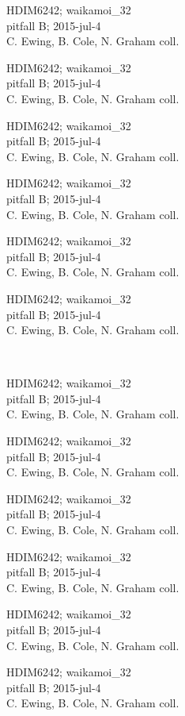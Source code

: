 \documentclass[2pt]{extarticle}
\begin{document}
\noindent
\parbox{0.16\textwidth}{\tiny \raggedright \rule[-0.3\baselineskip]{0pt}{10pt}HDIM6242; waikamoi\_32\\ pitfall B; 2015-jul-4\\ C. Ewing, B. Cole, N. Graham coll.}
\parbox{0.16\textwidth}{\tiny \raggedright \rule[-0.3\baselineskip]{0pt}{10pt}HDIM6242; waikamoi\_32\\ pitfall B; 2015-jul-4\\ C. Ewing, B. Cole, N. Graham coll.}
\parbox{0.16\textwidth}{\tiny \raggedright \rule[-0.3\baselineskip]{0pt}{10pt}HDIM6242; waikamoi\_32\\ pitfall B; 2015-jul-4\\ C. Ewing, B. Cole, N. Graham coll.}
\parbox{0.16\textwidth}{\tiny \raggedright \rule[-0.3\baselineskip]{0pt}{10pt}HDIM6242; waikamoi\_32\\ pitfall B; 2015-jul-4\\ C. Ewing, B. Cole, N. Graham coll.}
\parbox{0.16\textwidth}{\tiny \raggedright \rule[-0.3\baselineskip]{0pt}{10pt}HDIM6242; waikamoi\_32\\ pitfall B; 2015-jul-4\\ C. Ewing, B. Cole, N. Graham coll.}
\parbox{0.16\textwidth}{\tiny \raggedright \rule[-0.3\baselineskip]{0pt}{10pt}HDIM6242; waikamoi\_32\\ pitfall B; 2015-jul-4\\ C. Ewing, B. Cole, N. Graham coll.} \\ 
\vspace{0.001in} 

\noindent
\parbox{0.16\textwidth}{\tiny \raggedright \rule[-0.3\baselineskip]{0pt}{10pt}HDIM6242; waikamoi\_32\\ pitfall B; 2015-jul-4\\ C. Ewing, B. Cole, N. Graham coll.}
\parbox{0.16\textwidth}{\tiny \raggedright \rule[-0.3\baselineskip]{0pt}{10pt}HDIM6242; waikamoi\_32\\ pitfall B; 2015-jul-4\\ C. Ewing, B. Cole, N. Graham coll.}
\parbox{0.16\textwidth}{\tiny \raggedright \rule[-0.3\baselineskip]{0pt}{10pt}HDIM6242; waikamoi\_32\\ pitfall B; 2015-jul-4\\ C. Ewing, B. Cole, N. Graham coll.}
\parbox{0.16\textwidth}{\tiny \raggedright \rule[-0.3\baselineskip]{0pt}{10pt}HDIM6242; waikamoi\_32\\ pitfall B; 2015-jul-4\\ C. Ewing, B. Cole, N. Graham coll.}
\parbox{0.16\textwidth}{\tiny \raggedright \rule[-0.3\baselineskip]{0pt}{10pt}HDIM6242; waikamoi\_32\\ pitfall B; 2015-jul-4\\ C. Ewing, B. Cole, N. Graham coll.}
\parbox{0.16\textwidth}{\tiny \raggedright \rule[-0.3\baselineskip]{0pt}{10pt}HDIM6242; waikamoi\_32\\ pitfall B; 2015-jul-4\\ C. Ewing, B. Cole, N. Graham coll.} \\ 
\vspace{0.001in} 
\end{document}
